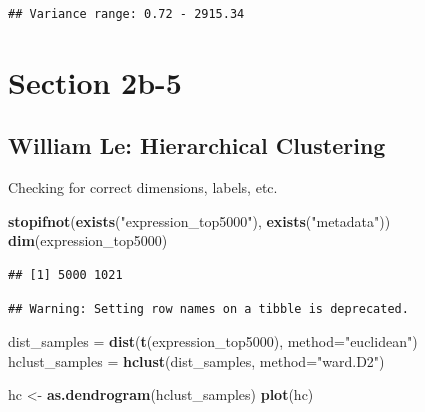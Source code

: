 \documentclass[
]{article}
\newenvironment{Shaded}{\begin{snugshade}}{\end{snugshade}}
\newcommand{\AttributeTok}[1]{\textcolor[rgb]{0.13,0.29,0.53}{#1}}
\newcommand{\FunctionTok}[1]{\textcolor[rgb]{0.13,0.29,0.53}{\textbf{#1}}}
\newcommand{\NormalTok}[1]{#1}
\newcommand{\OtherTok}[1]{\textcolor[rgb]{0.56,0.35,0.01}{#1}}
\newcommand{\SpecialCharTok}[1]{\textcolor[rgb]{0.81,0.36,0.00}{\textbf{#1}}}
\newcommand{\StringTok}[1]{\textcolor[rgb]{0.31,0.60,0.02}{#1}}
\begin{document}
\begin{verbatim}
## Variance range: 0.72 - 2915.34
\end{verbatim}

\section{Section 2b-5}\label{section-2b-5}

\subsection{William Le: Hierarchical
Clustering}\label{william-le-hierarchical-clustering}

Checking for correct dimensions, labels, etc.

\begin{Shaded}
\begin{Highlighting}[]
\FunctionTok{stopifnot}\NormalTok{(}\FunctionTok{exists}\NormalTok{(}\StringTok{"expression\_top5000"}\NormalTok{), }\FunctionTok{exists}\NormalTok{(}\StringTok{"metadata"}\NormalTok{))}
\FunctionTok{dim}\NormalTok{(expression\_top5000)}
\end{Highlighting}
\end{Shaded}

\begin{verbatim}
## [1] 5000 1021
\end{verbatim}

\begin{Shaded}
\end{Shaded}

\begin{verbatim}
## Warning: Setting row names on a tibble is deprecated.
\end{verbatim}

\begin{Shaded}
\begin{Highlighting}[]
\NormalTok{dist\_samples }\OtherTok{=} \FunctionTok{dist}\NormalTok{(}\FunctionTok{t}\NormalTok{(expression\_top5000), }\AttributeTok{method=}\StringTok{"euclidean"}\NormalTok{)}
\NormalTok{hclust\_samples }\OtherTok{=} \FunctionTok{hclust}\NormalTok{(dist\_samples, }\AttributeTok{method=}\StringTok{"ward.D2"}\NormalTok{)}

\NormalTok{hc }\OtherTok{\textless{}{-}} \FunctionTok{as.dendrogram}\NormalTok{(hclust\_samples)}
\FunctionTok{plot}\NormalTok{(hc)}
\end{Highlighting}
\end{Shaded}
\end{document}
